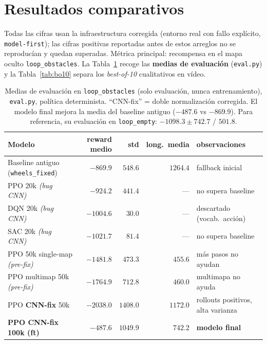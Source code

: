 \documentclass[11pt,a4paper]{article}
\newcommand{\code}[1]{\texttt{#1}}
\begin{document}
\section{Resultados comparativos}
\label{sec:res}
Todas las cifras usan la infraestructura corregida (entorno real con fallo explícito,
\code{model-first}); las cifras positivas reportadas antes de estos arreglos no se
reproducían y quedan superadas. Métrica principal: recompensa en el mapa oculto
\code{loop\_obstacles}. La Tabla~\ref{tab:medias} recoge las \textbf{medias de evaluación}
(\code{eval.py}) y la Tabla~\ref{tab:bo10} separa los \emph{best-of-10} cualitativos en vídeo.

\begin{table}[h]
\centering
\footnotesize
\setlength{\tabcolsep}{5pt}
\begin{tabular}{lrrrl}
\toprule
\textbf{Modelo} & \textbf{reward medio} & \textbf{std} & \textbf{long.\ media} & \textbf{observaciones} \\
\midrule
Baseline antiguo (\code{wheels\_fixed}) & $-869.9$ & $548.6$ & $1264.4$ & fallback inicial \\
PPO 20k \emph{(bug CNN)}           & $-924.2$  & $441.4$  & ---    & no supera baseline \\
DQN 20k \emph{(bug CNN)}           & $-1004.6$ & $30.0$   & ---    & descartado (vocab.\ acción) \\
SAC 20k \emph{(bug CNN)}           & $-1021.7$ & $81.4$   & ---    & no supera baseline \\
PPO 50k single-map \emph{(pre-fix)}& $-1481.8$ & $473.3$  & $455.6$& más pasos no ayudan \\
PPO multimap 50k \emph{(pre-fix)}  & $-1764.9$ & $712.8$  & $460.0$& multimapa no ayuda \\
\midrule
PPO \textbf{CNN-fix} 50k           & $-2038.0$ & $1408.0$ & $1172.0$ & rollouts positivos, alta varianza \\
\textbf{PPO CNN-fix 100k (ft)}     & $\mathbf{-487.6}$ & $1049.9$ & $742.2$ & \textbf{modelo final} \\
\bottomrule
\end{tabular}
\caption{Medias de evaluación en \code{loop\_obstacles} (solo evaluación, nunca
entrenamiento), \code{eval.py}, política determinista. ``CNN-fix'' = doble normalización
corregida. El modelo final mejora la media del baseline antiguo ($-487.6$ vs $-869.9$). Para
referencia, su evaluación en \code{loop\_empty}: $-1098.3 \pm 742.7$ / $501.8$.}
\label{tab:medias}
\end{table}
\end{document}
